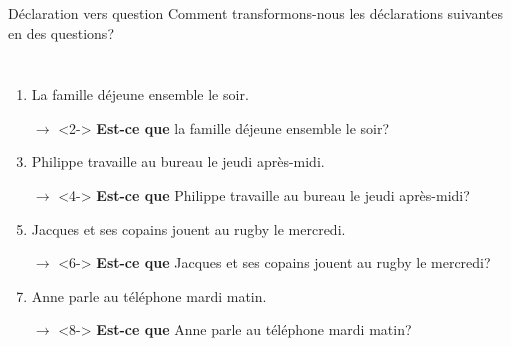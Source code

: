 \documentclass{beamer}
\begin{document}
  \begin{frame}{Déclaration vers question}
    Comment transformons-nous les déclarations suivantes en des questions? \\
    \begin{columns}
        \scriptsize
        \begin{enumerate}
          \item La famille déjeune ensemble le soir.
          \item[$\to$]<2-> \textbf{Est-ce que} la famille déjeune ensemble le soir?
          \item Philippe travaille au bureau le jeudi après-midi.
          \item[$\to$]<4-> \textbf{Est-ce que} Philippe travaille au bureau le jeudi après-midi?
          \item Jacques et ses copains jouent au rugby le mercredi.
          \item[$\to$]<6-> \textbf{Est-ce que} Jacques et ses copains jouent au rugby le mercredi?
          \item Anne parle au téléphone mardi matin.
          \item[$\to$]<8-> \textbf{Est-ce que} Anne parle au téléphone mardi matin?
        \end{enumerate}
        \begin{minipage}[c][0.6\textheight]{\linewidth}
          \begin{center}
          \end{center}
        \end{minipage}
    \end{columns}
  \end{frame}
\end{document}
